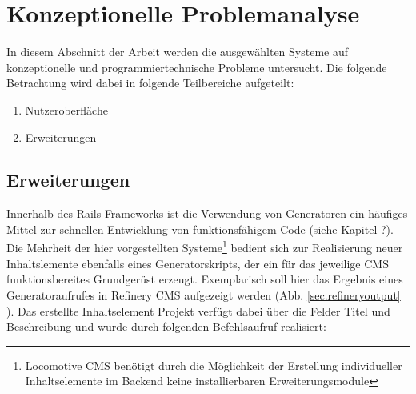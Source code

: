 \chapter{Konzeptionelle Problemanalyse}

In diesem Abschnitt der Arbeit werden die ausgewählten Systeme auf konzeptionelle und programmiertechnische Probleme untersucht. Die folgende Betrachtung wird dabei in folgende Teilbereiche aufgeteilt:

\begin{enumerate}
\item Nutzeroberfläche
\item Erweiterungen
\end{enumerate}


\section{Erweiterungen}

Innerhalb des Rails Frameworks ist die Verwendung von Generatoren ein häufiges Mittel zur schnellen Entwicklung von funktionsfähigem Code (siehe Kapitel ?). Die Mehrheit der hier vorgestellten Systeme\footnote{Locomotive CMS benötigt durch die Möglichkeit der Erstellung individueller Inhaltselemente im Backend keine installierbaren Erweiterungsmodule} bedient sich zur Realisierung neuer Inhaltslemente ebenfalls eines Generatorskripts, der ein für das jeweilige CMS funktionsbereites Grundgerüst erzeugt. Exemplarisch soll hier das Ergebnis eines Generatoraufrufes in Refinery CMS aufgezeigt werden (Abb. \ref{sec.refineryoutput} ). Das erstellte Inhaltselement Projekt verfügt dabei über die Felder Titel und Beschreibung und wurde durch folgenden Befehlsaufruf realisiert:






